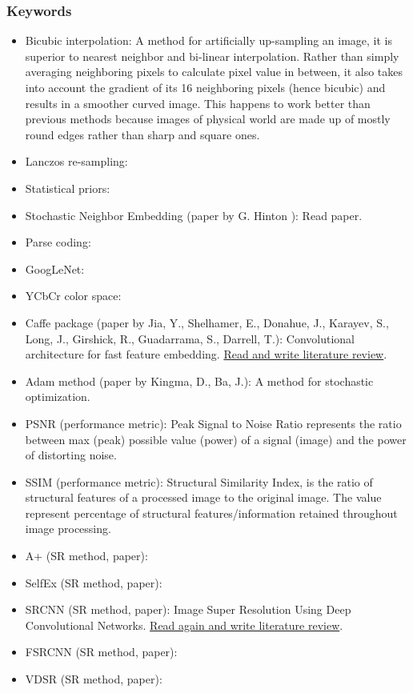 \documentclass[11pt]{article}
\begin{document}
\subsubsection{Keywords}
\begin{itemize}
	\item Bicubic interpolation: A method for artificially up-sampling an image, it is superior to nearest neighbor and bi-linear interpolation. Rather than simply averaging neighboring pixels to calculate pixel value in between, it also takes into account the gradient of its 16 neighboring pixels (hence bicubic) and results in a smoother curved image. This happens to work better than previous methods because images of physical world are made up of mostly round edges rather than sharp and square ones.

	\item Lanczos re-sampling:

	\item Statistical priors:

	\item Stochastic Neighbor Embedding (paper by G. Hinton \cite{SNE}): Read paper.

	\item Parse coding:

	\item GoogLeNet:

	\item YCbCr color space:

	\item Caffe package (paper by Jia, Y., Shelhamer, E., Donahue, J., Karayev, S., Long, J., Girshick, R., Guadarrama, S., Darrell, T.): Convolutional architecture for fast feature embedding. \underline{Read and write literature review}.

	\item Adam method (paper by Kingma, D., Ba, J.): A method for stochastic optimization.

	\item PSNR (performance metric): Peak Signal to Noise Ratio represents the ratio between max (peak) possible value (power) of a signal (image) and the power of distorting noise.

	\item SSIM (performance metric): Structural Similarity Index, is the ratio of structural features of a processed image to the original image. The value represent percentage of structural features/information retained throughout image processing.

	\item A+ (SR method, paper):

	\item SelfEx (SR method, paper):

	\item SRCNN (SR method, paper): Image Super Resolution Using Deep Convolutional Networks. \underline{Read again and write literature review}.

	\item FSRCNN (SR method, paper):

	\item VDSR (SR method, paper):

\end{itemize}
\end{document}
